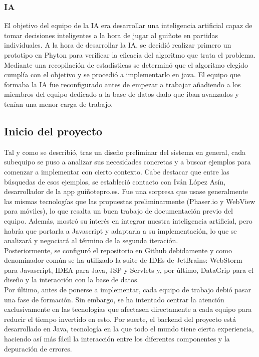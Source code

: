 \subsubsection*{IA}
El objetivo del equipo de la IA era desarrollar una inteligencia artificial capaz de tomar decisiones inteligentes a la hora de jugar al guiñote en partidas individuales. A la hora de desarrollar la IA, se decidió realizar primero un prototipo en Phyton para verificar la eficacia del algoritmo que trata el problema. Mediante una recopilación de estadísticas se determinó que el algoritmo elegido cumplía con el objetivo y se procedió a implementarlo en java.
El equipo que formaba la IA fue reconfigurado antes de empezar a trabajar añadiendo a los miembros del equipo dedicado a la base de datos dado que iban avanzados y tenían una menor carga de trabajo.

\subsection{Inicio del proyecto}
\label{Inicio del proyecto}
Tal y como se describió, tras un diseño preliminar del sistema en general, cada subequipo se puso a analizar sus necesidades concretas y a buscar ejemplos para comenzar a implementar con cierto contexto. Cabe destacar que entre las búsquedas de esos ejemplos, se estableció contacto con Iván López Asín, desarrollador de la app guiñotepro.es. Fue una sorpresa que usase generalmente las mismas tecnologías que las propuestas preliminarmente (Phaser.io y WebView para móviles), lo que resalta un buen trabajo de documentación previo del equipo. Además, mostró su interés en integrar nuestra  inteligencia artificial, pero habría que portarla a Javascript y adaptarla a su implementación, lo que se analizará y negociará al término de la segunda iteración.\\

Posteriormente, se configuró el repositorio en Github debidamente y como denominador común se ha utilizado la suite de IDEs de JetBrains: WebStorm para Javascript, IDEA para Java, JSP y Servlets y, por último, DataGrip para el diseño y la interacción con la base de datos.\\

Por último, antes de ponerse a implementar, cada equipo de trabajo debió pasar una fase de formación. Sin embargo, se ha intentado centrar la atención exclusivamente en las tecnologías que afectasen directamente a cada equipo para reducir el tiempo invertido en esto. Por suerte, el backend del proyecto está desarrollado en Java, tecnología en la que todo el mundo tiene cierta experiencia, haciendo así más fácil la interacción entre los diferentes componentes y la depuración de errores.\\

